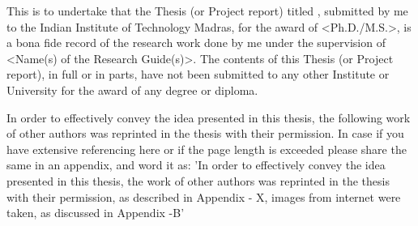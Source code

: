 \certificate

\vspace*{-0.2in}
\noindent This is to undertake that the Thesis (or Project report) titled \MakeUppercase{\textbf{\MyTitle}}, submitted by me %
to the Indian Institute of Technology Madras, for
the award of <Ph.D./M.S.>, is a bona fide
record of the research work done by me under the supervision of <Name(s) of the Research Guide(s)>.  The contents of this Thesis (or Project report), in full or in parts, have not been submitted to any other Institute or University for the award of any degree or diploma.


In order to effectively convey the idea presented in this thesis, the following work of other authors was reprinted in the thesis with their permission. In case if you have extensive referencing here or if the page length is exceeded please share the same in an appendix, and word it as: 'In order to effectively convey the idea presented in this thesis, the work of other authors was reprinted in the thesis with their permission, as described in Appendix - X, images from internet were taken, as discussed in Appendix -B'

